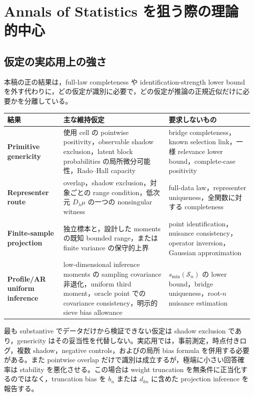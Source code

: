 \documentclass[11pt,a4paper]{ltjsarticle}
\theoremstyle{remark}
\newcommand{\Sop}{\mathscr S}
\begin{document}
\section{Annals of Statistics を狙う際の理論的中心}\label{sec:positioning}

\subsection{仮定の実応用上の強さ}
本稿の正の結果は，full-law completeness や identification-strength lower bound を外す代わりに，どの仮定が識別に必要で，どの仮定が推論の正規近似だけに必要かを分離している。
\begin{center}
\begin{tabularx}{0.97\textwidth}{>{\bfseries}p{34mm}X X}
\toprule
結果 & 主な維持仮定 & 要求しないもの\\
\midrule
Primitive genericity
& 使用 cell の pointwise positivity，observable shadow exclusion，latent block probabilities の局所微分可能性，Rado--Hall capacity
& bridge completeness，known selection link，一様 relevance lower bound，complete-case positivity\\
Representer route
& overlap，shadow exclusion，対象ごとの range condition，低次元 $D_\lambda\mu$ の一つの nonsingular witness
& full-data law，representer uniqueness，全関数に対する completeness\\
Finite-sample projection
& 独立標本と，設計した moments の既知 bounded range，または finite variance の保守的上界
& point identification，nuisance consistency，operator inversion，Gaussian approximation\\
Profile/AR uniform inference
& low-dimensional inference moments の sampling covariance 非退化，uniform third moment，oracle point での covariance consistency，明示的 sieve bias allowance
& $s_{\min}(\Sop_n)$ の lower bound，bridge uniqueness，root-$n$ nuisance estimation\\
\bottomrule
\end{tabularx}
\end{center}

最も substantive でデータだけから検証できない仮定は shadow exclusion であり，genericity はその妥当性を代替しない。実応用では，事前測定，時点付きログ，複数 shadow，negative controls，およびの局所 bias formula を併用する必要がある。また pointwise overlap だけで識別は成立するが，極端に小さい回答確率は stability を悪化させる。この場合は weight truncation を無条件に正当化するのではなく，truncation bias を $b_n$ または $d_{kn}$ に含めた projection inference を報告する。
\end{document}
